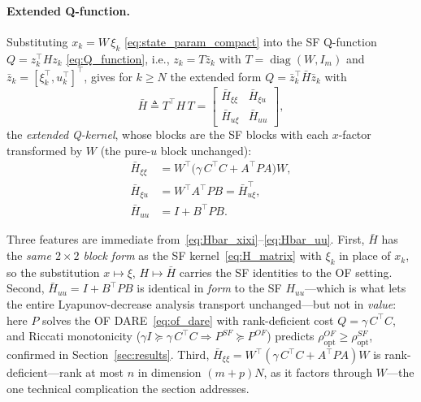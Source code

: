 \documentclass[final,5p,times,authoryear]{elsarticle}
\theoremstyle{plain}
\theoremstyle{definition}
\theoremstyle{remark}
\begin{document}
\paragraph{Extended Q-function.}
Substituting $x_k = W\,\xi_k$
\eqref{eq:state_param_compact} into the SF Q-function
$Q = z_k^{\!\top}\!H z_k$ \eqref{eq:Q_function}, i.e., $z_k = T\bar z_k$
with $T = \operatorname{diag}(W, I_m)$ and
$\bar z_k = [\xi_k^{\!\top}, u_k^{\!\top}]^{\!\top}$, gives for
$k \geq N$ the extended form $Q = \bar z_k^{\!\top}\bar H\bar z_k$ with
\begin{equation}
\bar H \triangleq T^{\!\top} H\, T
   = \begin{bmatrix} \bar H_{\xi\xi} & \bar H_{\xi u} \\
                     \bar H_{u\xi}   & \bar H_{uu} \end{bmatrix},
\label{eq:Hbar_def}
\end{equation}
the \emph{extended Q-kernel}, whose blocks are the SF blocks with each
$x$-factor transformed by $W$ (the pure-$u$ block unchanged):
\begin{align}
\bar H_{\xi\xi}
   &= W^{\!\top}\!\bigl(\gamma\,C^{\!\top}\!C + A^{\!\top}\!PA\bigr)W,
   \label{eq:Hbar_xixi}\\
\bar H_{\xi u}
   &= W^{\!\top}\!A^{\!\top}\!PB = \bar H_{u\xi}^{\!\top},\\
\bar H_{uu}
   &= I + B^{\!\top}\!PB. \label{eq:Hbar_uu}
\end{align}

Three features are immediate from~\eqref{eq:Hbar_xixi}--\eqref{eq:Hbar_uu}.
First, $\bar H$ has the \emph{same $2\times2$ block form} as the SF
kernel~\eqref{eq:H_matrix} with $\xi_k$ in place of $x_k$, so the
substitution $x\mapsto\xi$, $H\mapsto\bar H$ carries the SF identities to
the OF setting.  Second, $\bar H_{uu} = I + B^{\!\top}\!PB$ is identical
in \emph{form} to the SF $H_{uu}$---which is what lets the entire
Lyapunov-decrease analysis transport unchanged---but not in \emph{value}:
here $P$ solves the OF DARE~\eqref{eq:of_dare} with rank-deficient cost
$Q=\gamma\,C^{\!\top}\!C$, and Riccati monotonicity
($\gamma I \succeq \gamma\,C^{\!\top}\!C \Rightarrow P^{SF}\succeq P^{OF}$)
predicts $\rho_{\mathrm{opt}}^{OF} \geq \rho_{\mathrm{opt}}^{SF}$,
confirmed in Section~\ref{sec:results}.  Third,
$\bar H_{\xi\xi} = W^{\!\top}(\gamma\,C^{\!\top}\!C + A^{\!\top}\!PA)W$ is
rank-deficient---rank at most $n$ in dimension $(m+p)N$, as it factors
through $W$---the one technical complication the section addresses.
\end{document}
